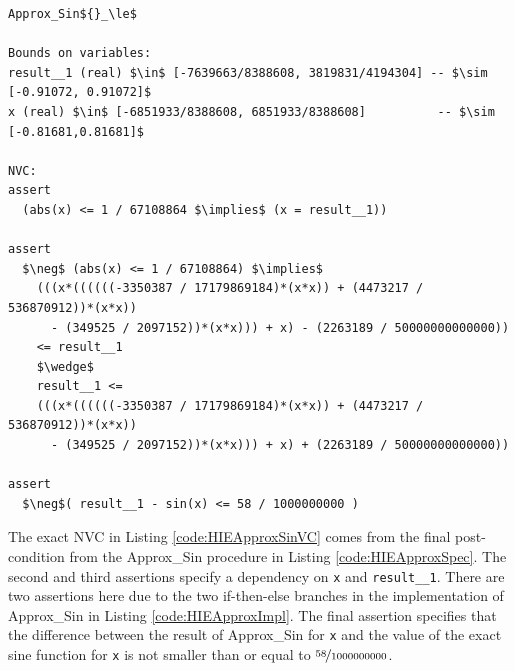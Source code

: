 \documentclass[runningheads]{llncs}
\begin{document}
\begin{lstlisting}[caption=Selected Approx\_Sin NVC, label={code:HIEApproxSinVC},basicstyle=\fontsize{7.5}{9pt}\tt,float=t]
Approx_Sin${}_\le$

Bounds on variables:
result__1 (real) $\in$ [-7639663/8388608, 3819831/4194304] -- $\sim [-0.91072, 0.91072]$
x (real) $\in$ [-6851933/8388608, 6851933/8388608]          -- $\sim [-0.81681,0.81681]$

NVC:
assert
  (abs(x) <= 1 / 67108864 $\implies$ (x = result__1))

assert
  $\neg$ (abs(x) <= 1 / 67108864) $\implies$
    (((x*((((((-3350387 / 17179869184)*(x*x)) + (4473217 / 536870912))*(x*x))
      - (349525 / 2097152))*(x*x))) + x) - (2263189 / 50000000000000))
    <= result__1
    $\wedge$
    result__1 <= 
    (((x*((((((-3350387 / 17179869184)*(x*x)) + (4473217 / 536870912))*(x*x)) 
      - (349525 / 2097152))*(x*x))) + x) + (2263189 / 50000000000000))

assert
  $\neg$( result__1 - sin(x) <= 58 / 1000000000 )
\end{lstlisting}

The exact NVC in Listing \ref{code:HIEApproxSinVC} comes from the final post-condition from the Approx\_Sin procedure in Listing \ref{code:HIEApproxSpec}.
The second and third assertions specify a dependency on \lstinline{x} and \lstinline{result__1}.
There are two assertions here due to the two if-then-else branches in the implementation of Approx\_Sin in Listing \ref{code:HIEApproxImpl}.
The final assertion specifies that the difference between the result of Approx\_Sin for \lstinline{x} and the value of the exact sine function for \lstinline{x} is not smaller than or equal to $\nicefrac{58}{1000000000}$.
\end{document}
